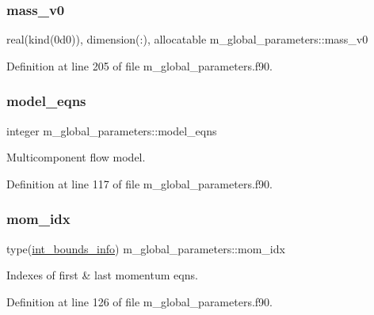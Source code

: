 \subsubsection{\texorpdfstring{mass\+\_\+v0}{mass\_v0}}
{\footnotesize\ttfamily real(kind(0d0)), dimension(\+:), allocatable m\+\_\+global\+\_\+parameters\+::mass\+\_\+v0}



Definition at line 205 of file m\+\_\+global\+\_\+parameters.\+f90.

\mbox{\label{namespacem__global__parameters_a6cf2e92cfc3b519fb6da6fe9e88fab31}} 
\subsubsection{\texorpdfstring{model\+\_\+eqns}{model\_eqns}}
{\footnotesize\ttfamily integer m\+\_\+global\+\_\+parameters\+::model\+\_\+eqns}



Multicomponent flow model. 



Definition at line 117 of file m\+\_\+global\+\_\+parameters.\+f90.

\mbox{\label{namespacem__global__parameters_a293bc6a9ccf7a197d8a5f0cfc3988584}} 
\subsubsection{\texorpdfstring{mom\+\_\+idx}{mom\_idx}}
{\footnotesize\ttfamily type(\hyperlink{structm__derived__types_1_1int__bounds__info}{int\+\_\+bounds\+\_\+info}) m\+\_\+global\+\_\+parameters\+::mom\+\_\+idx}



Indexes of first \& last momentum eqns. 



Definition at line 126 of file m\+\_\+global\+\_\+parameters.\+f90.

\mbox{\label{namespacem__global__parameters_a2663d07998d11d25e223cd7ad0bbd748}} 
